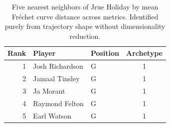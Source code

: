 \begin{table}[htbp]
  \centering\small
  \begin{tabular}{rllc}
    \toprule
    Rank & Player & Position & Archetype \\
    \midrule
    1 & Josh Richardson & G & 1 \\
    2 & Jamaal Tinsley & G & 1 \\
    3 & Ja Morant & G & 1 \\
    4 & Raymond Felton & G & 1 \\
    5 & Earl Watson & G & 1 \\
    \bottomrule
  \end{tabular}
  \caption{Five nearest neighbors of Jrue Holiday by mean Fr\'{e}chet curve distance across metrics. Identified purely from trajectory shape without dimensionality reduction.}
  \label{tab:Jrue_Holiday_frechet_curve_neighbors}
\end{table}

